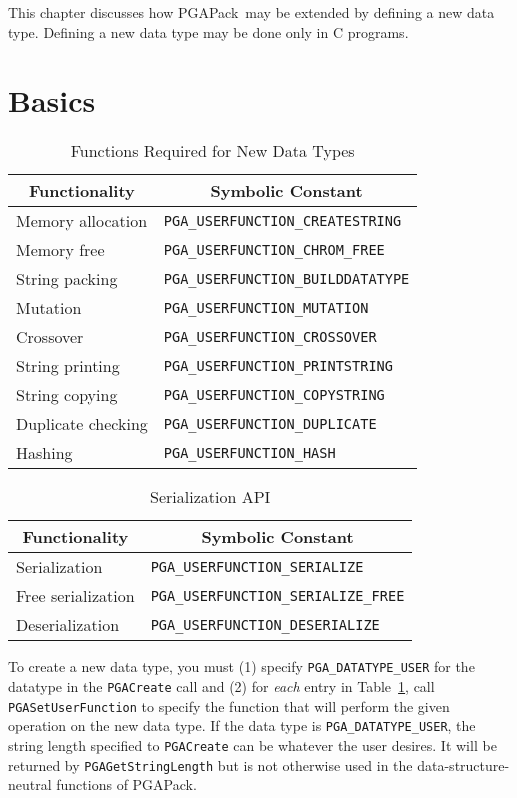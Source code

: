 \documentclass{report}
\newcommand{\pga}{PGAPack}
\begin{document}
This chapter discusses how \pga\ may be extended by defining a new data type.
Defining a new data type may be done  only in C programs.

\section{Basics}

\begin{table}
\centering
\caption
{
Functions Required for New Data Types\label{tab:new-functions}
}
\begin{tabular}{|l|l|} \hline\hline
\multicolumn{1}{|c|}{Functionality} &
\multicolumn{1}{c|}{Symbolic Constant} \\ \hline
Memory allocation & \verb+PGA_USERFUNCTION_CREATESTRING+ \\
Memory free & \verb+PGA_USERFUNCTION_CHROM_FREE+ \\
String packing & \verb+PGA_USERFUNCTION_BUILDDATATYPE+ \\
Mutation & \verb+PGA_USERFUNCTION_MUTATION+ \\
Crossover & \verb+PGA_USERFUNCTION_CROSSOVER+ \\
String printing & \verb+PGA_USERFUNCTION_PRINTSTRING+ \\
String copying & \verb+PGA_USERFUNCTION_COPYSTRING+ \\
Duplicate checking & \verb+PGA_USERFUNCTION_DUPLICATE+ \\
Hashing & \verb+PGA_USERFUNCTION_HASH+ \\
\hline
\end{tabular}
\end{table}

\begin{table}
\centering
\caption
{
Serialization API\label{tab:serialization-functions}
}
\begin{tabular}{|l|l|} \hline\hline
\multicolumn{1}{|c|}{Functionality} &
\multicolumn{1}{c|}{Symbolic Constant} \\ \hline
Serialization & \verb+PGA_USERFUNCTION_SERIALIZE+ \\
Free serialization & \verb+PGA_USERFUNCTION_SERIALIZE_FREE+ \\
Deserialization & \verb+PGA_USERFUNCTION_DESERIALIZE+ \\
\hline
\end{tabular}
\end{table}

To create a new data type, you must (1) specify \verb+PGA_DATATYPE_USER+ for
the datatype in the \verb+PGACreate+ call and (2) for {\em each} entry in
Table~\ref{tab:new-functions}, call \verb+PGASetUserFunction+ to specify the
function that will perform the given operation on the new data type.  If the
data type is \verb+PGA_DATATYPE_USER+, the string length specified to
\verb+PGACreate+ can be whatever the user desires.  It will be returned by
\verb+PGAGetStringLength+ but is not otherwise used in the
data-structure-neutral functions of \pga.
\end{document}
